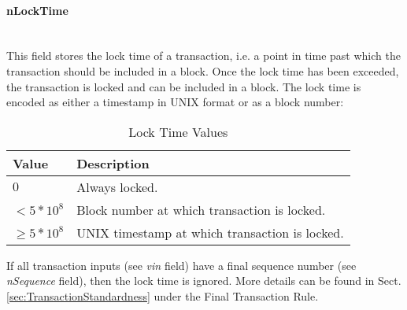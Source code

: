 \paragraph{nLockTime}~\\
This field stores the lock time of a transaction, i.e. a point in time past which the transaction should be included in a block. Once the lock time has been exceeded, the transaction is locked and can be included in a block. The lock time is encoded as either a timestamp in UNIX format or as a block number:

\begin{table}
\centering
	\begin{tabular}{| >{\centering} m{40pt} | m{200pt} |}
	
	\hline
	\textbf{Value} &
	\textbf{Description} \\ \hline\hline
	
	$0$ & Always locked. \\ \hline \rule{0pt}{10pt}
	$< 5*10^{8}$ & Block number at which transaction is locked. \\ \hline \rule{0pt}{10pt}
	$\geq 5*10^{8}$ & UNIX timestamp at which transaction is locked. \\ \hline
	\end{tabular}
	
	\vspace{5pt}
	\caption{Lock Time Values}
	\label{tab:LockTime}
\end{table}
\vspace{-15pt}

\noindent
If all transaction inputs (see \textit{vin} field) have a final sequence number (see \mbox{\textit{nSequence}} field), then the lock time is ignored. More details can be found in Sect. \ref{sec:TransactionStandardness} under the Final Transaction Rule.


\clearpage
